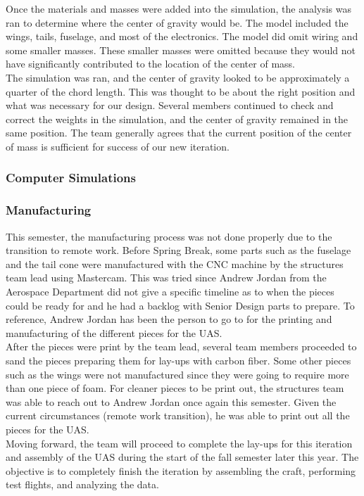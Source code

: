 \documentclass{article}
\begin{document}
Once the materials and masses were added into the simulation, the analysis was ran to determine where the center of gravity would be. The model included the wings, tails, fuselage, and most of the electronics. The model did omit wiring and some smaller masses. These smaller masses were omitted because they would not have significantly contributed to the location of the center of mass.\\

The simulation was ran, and the center of gravity looked to be approximately a quarter of the chord length. This was thought to be about the right position and what was necessary for our design. Several members continued to check and correct the weights in the simulation, and the center of gravity remained in the same position. The team generally agrees that the current position of the center of mass is sufficient for success of our new iteration.\\

\subsubsection{Computer Simulations}


\subsubsection{Manufacturing}
This semester, the manufacturing process was not done properly due to the transition to remote work. Before Spring Break, some parts such as the fuselage and the tail cone were manufactured with the CNC machine by the structures team lead using Mastercam. This was tried since Andrew Jordan from the Aerospace Department did not give a specific timeline as to when the pieces could be ready for and he had a backlog with Senior Design parts to prepare. To reference, Andrew Jordan has been the person to go to for the printing and manufacturing of the different pieces for the UAS. \\
After the pieces were print by the team lead, several team members proceeded to sand the pieces preparing them for lay-ups with carbon fiber. Some other pieces such as the wings were not manufactured since they were going to require more than one piece of foam. For cleaner pieces to be print out, the structures team was able to reach out to Andrew Jordan once again this semester. Given the current circumstances (remote work transition), he was able to print out all the pieces for the UAS. \\
Moving forward, the team will proceed to complete the lay-ups for this iteration and assembly of the UAS during the start of the fall semester later this year. The objective is to completely finish the iteration by assembling the craft, performing test flights, and analyzing the data.\\
\end{document}
